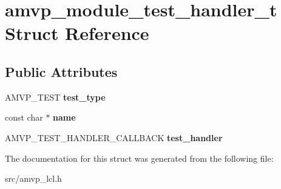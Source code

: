 \hypertarget{structamvp__module__test__handler__t}{\section{amvp\-\_\-module\-\_\-test\-\_\-handler\-\_\-t Struct Reference}
\label{structamvp__module__test__handler__t}
}
\subsection*{Public Attributes}
\begin{DoxyCompactItemize}
\item 
\hypertarget{structamvp__module__test__handler__t_ae03ff3925cc9a90fa0963b3ec07dedcb}{A\-M\-V\-P\-\_\-\-T\-E\-S\-T {\bfseries test\-\_\-type}}\label{structamvp__module__test__handler__t_ae03ff3925cc9a90fa0963b3ec07dedcb}

\item 
\hypertarget{structamvp__module__test__handler__t_aba5cd5b44d0bdbc1c91987e520cc71c2}{const char $\ast$ {\bfseries name}}\label{structamvp__module__test__handler__t_aba5cd5b44d0bdbc1c91987e520cc71c2}

\item 
\hypertarget{structamvp__module__test__handler__t_ad9be868d8819827c94a1043274b422bf}{A\-M\-V\-P\-\_\-\-T\-E\-S\-T\-\_\-\-H\-A\-N\-D\-L\-E\-R\-\_\-\-C\-A\-L\-L\-B\-A\-C\-K {\bfseries test\-\_\-handler}}\label{structamvp__module__test__handler__t_ad9be868d8819827c94a1043274b422bf}

\end{DoxyCompactItemize}


The documentation for this struct was generated from the following file\-:\begin{DoxyCompactItemize}
\item 
src/amvp\-\_\-lcl.\-h\end{DoxyCompactItemize}
